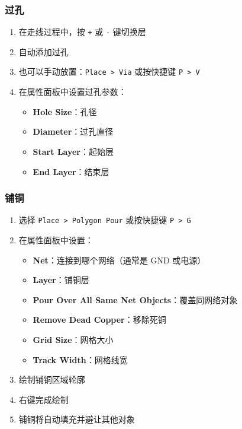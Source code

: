 \subsubsection{过孔}


\begin{enumerate}
  \item 在走线过程中，按 \lstinline{+} 或 \lstinline{-} 键切换层
  \item 自动添加过孔
  \item 也可以手动放置：\lstinline{Place > Via} 或按快捷键 \lstinline{P > V}
  \item 在属性面板中设置过孔参数：
    \begin{itemize}
      \item \textbf{Hole Size}：孔径
      \item \textbf{Diameter}：过孔直径
      \item \textbf{Start Layer}：起始层
      \item \textbf{End Layer}：结束层
    \end{itemize}
\end{enumerate}

\subsubsection{铺铜}


\begin{enumerate}
  \item 选择 \lstinline{Place > Polygon Pour} 或按快捷键 \lstinline{P > G}
  \item 在属性面板中设置：
    \begin{itemize}
      \item \textbf{Net}：连接到哪个网络（通常是 GND 或电源）
      \item \textbf{Layer}：铺铜层
      \item \textbf{Pour Over All Same Net Objects}：覆盖同网络对象
      \item \textbf{Remove Dead Copper}：移除死铜
      \item \textbf{Grid Size}：网格大小
      \item \textbf{Track Width}：网格线宽
    \end{itemize}
  \item 绘制铺铜区域轮廓
  \item 右键完成绘制
  \item 铺铜将自动填充并避让其他对象
\end{enumerate}

